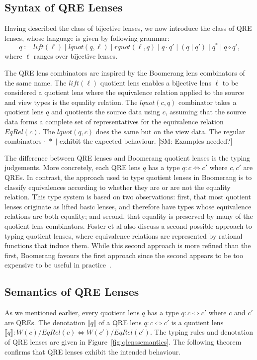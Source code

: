 \documentclass{svproc}
\newcommand{\FINISH}[3]{\ifdraft\textcolor{#1}{[#2: #3]}\fi}
\newcommand{\sam}[1]{\FINISH{dkpurple}{SM}{#1}}
\newcommand{\sep}{\ensuremath{\; | \;}}
\begin{document}
\subsection{Syntax of QRE Lenses}
Having described the class of bijective lenses, we now introduce the class
of QRE lenses, whose language is given by following grammar:
$$ q := \mathit{lift}(\ell) \sep \mathit{lquot}(q, \ell) \sep
\mathit{rquot}(\ell, q) \sep q \cdot q' \sep (q \sep q') \sep q^* \sep q \circ q',$$
where $\ell$ ranges over bijective lenses.

The QRE lens combinators are inspired by the Boomerang lens combinators of the
same name. The $\mathit{lift}(\ell)$ quotient lens enables a bijective lens
$\ell$ to be considered a quotient lens where the equivalence relation applied
to the source and view types is the equality relation. The $\mathit{lquot}(c,
q)$ combinator takes a quotient lens $q$ and quotients the source data using
$c$, assuming that the source data forms a complete set of representatives for
the equivalence relation $EqRel(c)$. The $\mathit{lquot}(q, c)$ does the same
but on the view data. The regular combinators $\cdot \; * \; |$ exhibit the
expected behaviour. \sam{Examples needed?}

The difference between QRE lenses and Boomerang quotient lenses is the typing
judgements. More concretely, each QRE lens $q$ has a type $q : c \Leftrightarrow
c'$ where $c, c'$ are QREs. In contrast, the approach used to type quotient
lenses in Boomerang is to classify equivalences according to whether they are
or are not the equality relation. This type system is based on two
observations: first, that most quotient lenses originate as lifted basic
lenses, and therefore have types whose equivalence relations are both equality;
and second, that equality is preserved by many of the quotient lens
combinators. Foster et al also discuss a second possible approach to typing
quotient lenses, where equivalence relations are represented by rational
functions that induce them. While this second approach is more refined than the
first, Boomerang favours the first approach since the second appears to be too
expensive to be useful in practice~\cite{quotientlenses}.

\subsection{Semantics of QRE Lenses}
As we mentioned earlier, every quotient lens $q$ has a type $q :
c \Longleftrightarrow c'$ where $c$ and $c'$ are QREs. The denotation
$\llbracket q \rrbracket$ of a QRE lens $q:c \Leftrightarrow c'$ is a quotient
lens $\llbracket q \rrbracket : W(c)/{EqRel(c)} \Longleftrightarrow
W(c')/{EqRel(c')}$. The typing rules and denotation of QRE lenses are given in
Figure~\ref{fig:qlenssemantics}. The following theorem confirms that QRE lenses
exhibit the intended behaviour.
\end{document}
